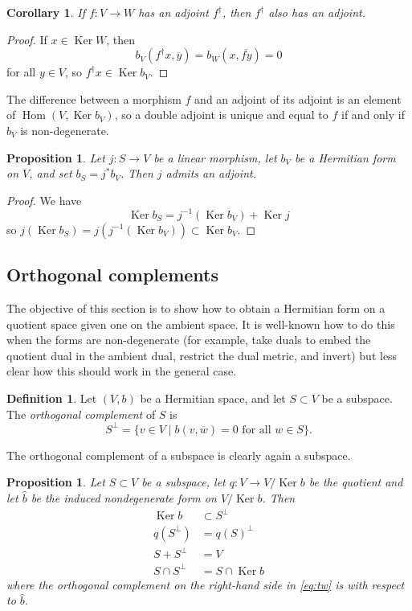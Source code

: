 \documentclass[10pt,a4paper]{amsart}
\newtheorem{prop}[theo]{Proposition}
\newtheorem{coro}[theo]{Corollary}
\theoremstyle{definition}
\newtheorem{defi}[theo]{Definition}
\def\ov#1{\overline{#1}}
\DeclareMathOperator{\Ker}{Ker}
\DeclareMathOperator{\Hom}{Hom}
\begin{document}
\begin{coro}
If $f : V \to W$ has an adjoint $f^\dagger$, then $f^\dagger$ also has an adjoint.
\end{coro}

\begin{proof}
If $x \in \Ker W$, then
\[
b_V(f^\dagger x, \ov y)
= b_W(x, \ov{fy})
= 0
\]
for all $y \in V$, so $f^\dagger x \in \Ker b_V$.
\end{proof}

The difference between a morphism $f$ and an adjoint of its adjoint is an element of $\Hom(V, \Ker b_V)$, so a double adjoint is unique and equal to $f$ if and only if $b_V$ is non-degenerate.


\begin{prop}
Let $j : S \to V$ be a linear morphism, let $b_V$ be a Hermitian form on $V$, and set $b_S = j^*b_V$. Then $j$ admits an adjoint.
\end{prop}

\begin{proof}
We have
\[
\Ker b_S = j^{-1}(\Ker b_V) + \Ker j
\]
so $j(\Ker b_S) = j(j^{-1}(\Ker b_V)) \subset \Ker b_V$.
\end{proof}






\subsection*{Orthogonal complements}


The objective of this section is to show how to obtain a Hermitian form on a quotient space given one on the ambient space. It is well-known how to do this when the forms are non-degenerate (for example, take duals to embed the quotient dual in the ambient dual, restrict the dual metric, and invert) but less clear how this should work in the general case.


\begin{defi}
Let $(V,b)$ be a Hermitian space, and let $S \subset V$ be a subspace. The \emph{orthogonal complement} of $S$ is
\[
S^\perp = \{ v \in V \mid b(v, \ov w) = 0 \text{ for all $w \in S$}\}.
\]
\end{defi}

The orthogonal complement of a subspace is clearly again a subspace.

\begin{prop}
Let $S \subset V$ be a subspace, let $q : V \to V / \Ker b$ be the quotient and
let $\hat b$ be the induced nondegenerate form on $V / \Ker b$.
Then
\begin{align}
\label{eq:on}
\Ker b &\subset S^\perp
\\
\label{eq:tw}
q(S^\perp) &= q(S)^\perp
\\
\label{eq:th}
S + S^\perp &= V
\\
\label{eq:fo}
S \cap S^\perp &= S \cap \Ker b
\end{align}
where the orthogonal complement on the right-hand side in \eqref{eq:tw} is with respect to $\hat b$.
\end{prop}
\end{document}
